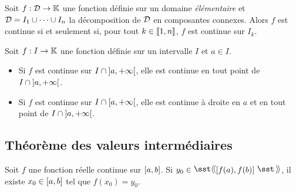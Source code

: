 \documentclass{magnolia}
\begin{document}
\begin{proposition}
Soit $f:\mathcal{D}\to\mathbb{K}$ une fonction définie sur un domaine \emph{élémentaire} et
$\mathcal{D}=I_1\cup\cdots\cup I_n$ la décomposition de $\mathcal{D}$ en composantes connexes. Alors $f$
est continue si et seulement si, pour tout $k\in\left\llbracket 1,n\right\rrbracket$, $f$ est continue
sur $I_k$.
\end{proposition}

\begin{proposition}
Soit $f:I\to\mathbb{K}$ une fonction définie sur un intervalle $I$ et $a\in I$.
\begin{itemize}
\item Si $f$ est continue sur $I\cap\left]a,+\infty\right[$, elle est continue en tout
  point de $I\cap\left]a,+\infty\right[$.
\item Si $f$ est continue sur $I\cap\left[a,+\infty\right[$, elle est continue à droite
  en $a$ et en tout point de $I\cap\left]a,+\infty\right[$.
\end{itemize}
\end{proposition}


\subsection{Théorème des valeurs intermédiaires}

\begin{theoreme}[nom={Théorème des valeurs intermédiaires}]
Soit $f$ une fonction réelle continue sur $\left[a,b\right]$. Si
  $y_0\in\intergf{f(a)}{f(b)}$, il existe $x_0\in\left[a,b\right]$ tel
  que $f(x_0)=y_0$.
\end{theoreme}
\end{document}

